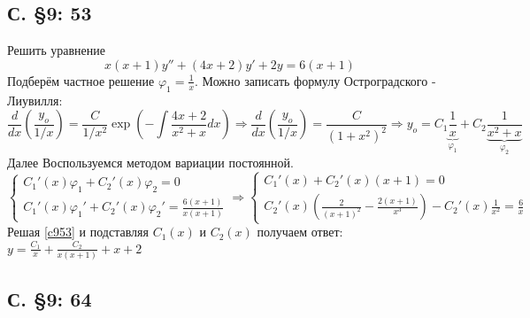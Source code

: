 \documentclass{article}
\begin{document}
\subsection{С. \S9: 53 }
Решить уравнение \begin{equation}
    x(x+1)y'' + (4x+2)y' + 2y = 6(x+1)
\end{equation}
Подберём частное решение $\varphi_1 = \frac{1}{x}$. Можно записать формулу Остроградского - Лиувилля:
\begin{equation}
    \frac{d}{dx} \left( \frac{y_o}{1/x} \right) = \frac{C}{1/x^2} \exp \left( - \int  \frac{4x+2}{x^2+x} dx\right) 
    \Rightarrow 
    \frac{d}{dx} \left( \frac{y_o}{1/x} \right) = \frac{C}{(1+x^2)^2}
    \Rightarrow
    y_o = C_1 \underbrace{\frac{1}{x}}_{\varphi_1} + C_2\underbrace{\frac{1}{x^2+x}}_{\varphi_2}        
\end{equation}
    Далее Воспользуемся методом вариации постоянной.
    \begin{equation} \label{c953}
        \begin{cases}
            C_1'(x) \varphi_1 + C_2'(x) \varphi_2 = 0 \\
            C_1'(x) \varphi_1' + C_2'(x) \varphi_2' = \frac{6(x+1)}{x (x+1)}
        \end{cases}
        \Rightarrow
        \begin{cases}
            C_1'(x) + C_2'(x) (x+1) = 0 \\
            C_2'(x) \left( \frac{2}{(x+1)^2} - \frac{2(x+1)}{x^3} \right) - C_2'(x) \frac{1}{x^2} = \frac{6}{x}
        \end{cases}
    \end{equation}
    Решая \ref{c953} и подставляя $C_1(x)$ и $C_2(x)$ получаем ответ: $y=\frac{C_1}{x}+\frac{C_2}{x(x+1)}+x+2$


\subsection{С. \S9: 64 }
\end{document}
